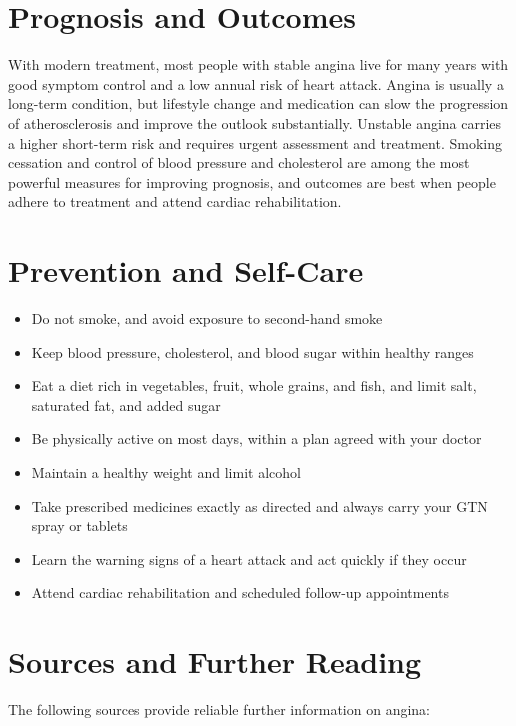 \section*{Prognosis and Outcomes}
With modern treatment, most people with stable angina live for many years with good symptom control and a low annual risk of heart attack. Angina is usually a long-term condition, but lifestyle change and medication can slow the progression of atherosclerosis and improve the outlook substantially. Unstable angina carries a higher short-term risk and requires urgent assessment and treatment. Smoking cessation and control of blood pressure and cholesterol are among the most powerful measures for improving prognosis, and outcomes are best when people adhere to treatment and attend cardiac rehabilitation.

\section*{Prevention and Self-Care}
\begin{itemize}
    \item Do not smoke, and avoid exposure to second-hand smoke
    \item Keep blood pressure, cholesterol, and blood sugar within healthy ranges
    \item Eat a diet rich in vegetables, fruit, whole grains, and fish, and limit salt, saturated fat, and added sugar
    \item Be physically active on most days, within a plan agreed with your doctor
    \item Maintain a healthy weight and limit alcohol
    \item Take prescribed medicines exactly as directed and always carry your GTN spray or tablets
    \item Learn the warning signs of a heart attack and act quickly if they occur
    \item Attend cardiac rehabilitation and scheduled follow-up appointments
\end{itemize}

\section*{Sources and Further Reading}
The following sources provide reliable further information on angina:

